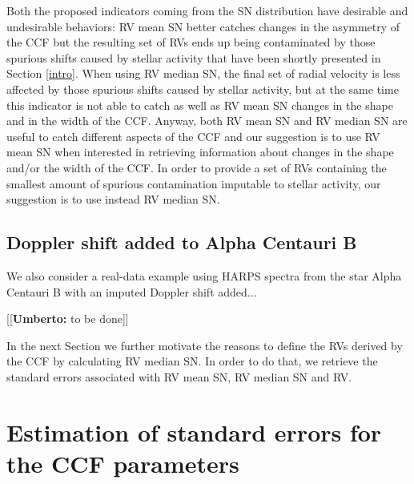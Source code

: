 \documentclass[11pt, oneside]{article}
\newcommand{\umberto}[1]{{\color{green}[[\textbf{Umberto: }#1]]}}
\begin{document}
Both the proposed indicators coming from the SN distribution have desirable and undesirable behaviors: RV mean SN better catches changes in the asymmetry of the CCF but the resulting set of RVs ends up being contaminated by those spurious shifts caused by stellar activity that have been shortly presented in Section \ref{intro}. When using RV median SN, the final set of radial velocity is less affected by those spurious shifts caused by stellar activity, but at the same time this indicator is not able to catch as well as RV mean SN changes in the shape and in the width of the CCF. Anyway, both RV mean SN and RV median SN are useful to catch different aspects of the CCF and our suggestion is to use RV mean SN when interested in retrieving information about changes in the shape and/or the width of the CCF. In order to provide a set of RVs containing the smallest amount of spurious contamination imputable to stellar activity, our suggestion is to use instead RV median SN. 

\subsection{Doppler shift added to Alpha Centauri B} \label{sec:soap_real}

We also consider a real-data example using HARPS spectra from the star Alpha Centauri B with an imputed Doppler shift added...

\umberto{to be done}

In the next Section we further motivate the reasons to define the RVs derived by the CCF by calculating RV median SN. In order to do that, we retrieve the standard errors associated with RV mean SN, RV median SN and RV.

\section{Estimation of standard errors for the CCF parameters} \label{sec:5}
\end{document}
